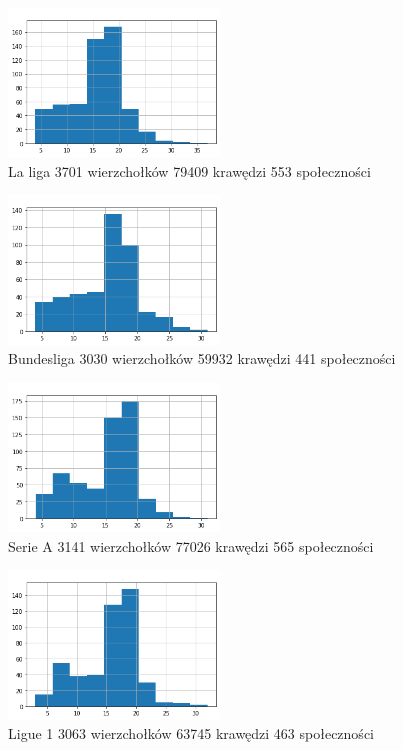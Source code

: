 \documentclass{article}
\begin{document}
\begin{figure}[H]
    \centering
    \includegraphics[width=0.5\textwidth]{images/hla.png}
    \caption{La liga 3701 wierzchołków 79409 krawędzi 553 społeczności}
    \label{fig:my_label}
\end{figure}

\begin{figure}[H]
    \centering
    \includegraphics[width=0.5\textwidth]{images/hbu.png}
    \caption{Bundesliga 3030 wierzchołków 59932 krawędzi 441 społeczności}
    \label{fig:my_label}
\end{figure}

\begin{figure}[H]
    \centering
    \includegraphics[width=0.5\textwidth]{images/hsa.png}
    \caption{Serie A 3141 wierzchołków 77026 krawędzi 565 społeczności}
    \label{fig:my_label}
\end{figure}

\begin{figure}[H]
    \centering
    \includegraphics[width=0.5\textwidth]{images/hl1.png}
    \caption{Ligue 1 3063 wierzchołków 63745 krawędzi 463 społeczności}
    \label{fig:my_label}
\end{figure}
\end{document}

